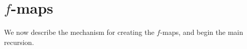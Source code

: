 \section{\texorpdfstring{\( f \)}{f}-maps}

We now describe the mechanism for creating the \( f \)-maps, and begin the main recursion.




